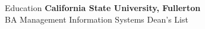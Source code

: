 \documentclass{resume} %
\begin{document}

\begin{rSection}{Education}
{\bf California State University, Fullerton}
\\BA Management Information Systems\hfill { Dean's List }

\end{rSection}
\end{document}
